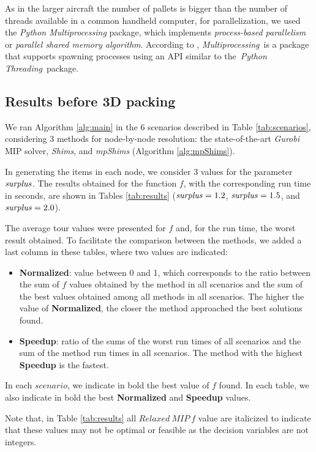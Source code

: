 \documentclass[preprint,authoryear]{elsarticle}
\begin{document}
As in the larger aircraft the number of pallets is bigger than the number of threads available in a common handheld computer, for parallelization, we used the {\it Python Multiprocessing} package, which implements {\it process-based parallelism} or {\it parallel shared memory algorithm}. According to \cite{multiprocessing}, {\it Multiprocessing} is a package that supports spawning processes using an API similar to the {\it Python Threading} package.


\subsection{Results {\bf before} 3D packing}

We ran Algorithm \ref{alg:main} in the 6 scenarios described in Table \ref{tab:scenarios}, considering 3 methods for node-by-node resolution: the state-of-the-art {\it Gurobi} MIP solver, {\it Shims}, and {\it mpShims} (Algorithm \ref{alg:mpShims}).

In generating the items in each node, we consider 3 values for the parameter ${\it surplus}$. The results obtained for the function $f$, with the corresponding run time in seconds, are shown in Tables \ref{tab:results} (${\it surplus} = 1.2$, ${\it surplus} = 1.5$, and ${\it surplus} = 2.0$).

The average tour values were presented for $f$ and, for the run time, the worst result obtained. To facilitate the comparison between the methods, we added a last column in these tables, where two values are indicated:
\begin{itemize}
	\item {\bf Normalized}: value between 0 and 1, which corresponds to the ratio between the sum of $f$\/ values obtained by the method in all scenarios and the sum of the best values obtained among all methods in all scenarios. The higher the value of {\bf Normalized}, the closer the method approached the best solutions found.
	\item {\bf Speedup}: ratio of the sums of the worst run times of all scenarios and the sum of the method run times in all scenarios. The method with the highest {\bf Speedup}\/ is the fastest.
\end{itemize}

In each $scenario$, we indicate in bold the best value of $f$\/ found. In each table, we also indicate in bold the best {\bf Normalized}\/ and {\bf Speedup}\/ values.

Note that, in Table \ref{tab:results} all $Relaxed\ MIP\ f$ value are italicized to indicate that these values may not be optimal or feasible as the decision variables are not integers.
\end{document}
